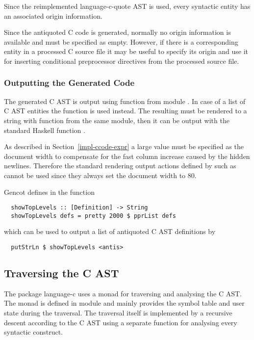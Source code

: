 Since the reimplemented language-c-quote AST is used, every syntactic entity has an associated origin information.

Since the antiquoted C code is generated, normally no origin information is available and must be specified as
empty. However, if there is a corresponding entity in a processed C source file it may be useful to specify 
its origin and use it for inserting conditional preprocessor directives from the processed source file.

\subsubsection{Outputting the Generated Code}

The generated C AST is output using function  from module . In case of 
a list of C AST entities the function  is used instead. The resulting
 must be rendered to a string with function  from the same module, then it can be 
output with the standard Haskell function . 

As described in 
Section~\ref{impl-ccode-expr} a large value must be specified as the document width to compensate for the 
fast column increase caused by the hidden newlines. Therefore the standard rendering output actions defined
by  such as  cannot be used since they always set the document
width to 80.

Gencot defines in  the function
\begin{verbatim}
  showTopLevels :: [Definition] -> String
  showTopLevels defs = pretty 2000 $ pprList defs
\end{verbatim}
which can be used to output a list  of antiquoted C AST definitions by
\begin{verbatim}
  putStrLn $ showTopLevels <antis>
\end{verbatim}

\subsection{Traversing the C AST}
\label{impl-ccode-trav}

The package language-c uses a monad for traversing and analysing the C AST. The monad is defined in module 
 and mainly provides the symbol table and user state during the traversal.
The traversal itself is implemented by a recursive descent according to the C AST using a separate function
for analysing every syntactic construct. 

